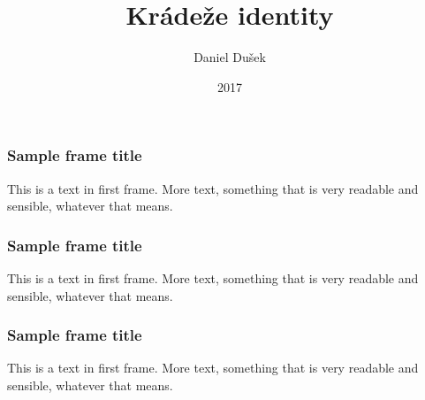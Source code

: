 \documentclass{beamer}
\title{Krádeže identity}
\author{Daniel Dušek}
\institute{Brno University of Technology}
\date{2017}
\begin{document}
	\begin{frame}
	\frametitle{Sample frame title}
	This is a text in first frame. More text, something that is very readable and sensible, whatever that means.
	\end{frame}

	\begin{frame}
	\frametitle{Sample frame title}
	This is a text in first frame. More text, something that is very readable and sensible, whatever that means.
	\end{frame}

	\begin{frame}
	\frametitle{Sample frame title}
	This is a text in first frame. More text, something that is very readable and sensible, whatever that means.
	\end{frame}
\end{document}
